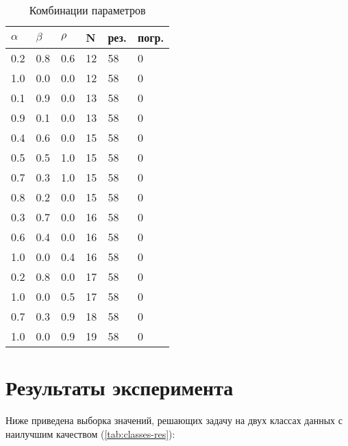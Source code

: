 \begin{table}[!h]
    \centering
    \caption{Комбинации параметров}
    \renewcommand{\arraystretch}{1.15}
    \begin{tabular}{||p{}p{}p{}p{}p{}p{}||}
        \hline
        $\alpha$ & $\beta$ & $\rho$ & N & рез. & погр. \\ \hline\hline
        0.2 & 0.8 & 0.6 & 12 & 58 & 0 \\ 
        1.0 & 0.0 & 0.0 & 12 & 58 & 0 \\ 
        0.1 & 0.9 & 0.0 & 13 & 58 & 0 \\ 
        0.9 & 0.1 & 0.0 & 13 & 58 & 0 \\ 
        0.4 & 0.6 & 0.0 & 15 & 58 & 0 \\ 
        0.5 & 0.5 & 1.0 & 15 & 58 & 0 \\ 
        0.7 & 0.3 & 1.0 & 15 & 58 & 0 \\ 
        0.8 & 0.2 & 0.0 & 15 & 58 & 0 \\ 
        0.3 & 0.7 & 0.0 & 16 & 58 & 0 \\ 
        0.6 & 0.4 & 0.0 & 16 & 58 & 0 \\ 
        1.0 & 0.0 & 0.4 & 16 & 58 & 0 \\ 
        0.2 & 0.8 & 0.0 & 17 & 58 & 0 \\ 
        1.0 & 0.0 & 0.5 & 17 & 58 & 0 \\ 
        0.7 & 0.3 & 0.9 & 18 & 58 & 0 \\ 
        1.0 & 0.0 & 0.9 & 19 & 58 & 0 \\ 
        \hline
    \end{tabular}
    \label{tab:class2}
\end{table}

\section{Результаты эксперимента}

Ниже приведена выборка значений, решающих задачу на двух классах данных с наилучшим качеством (\ref{tab:classes-res}):


